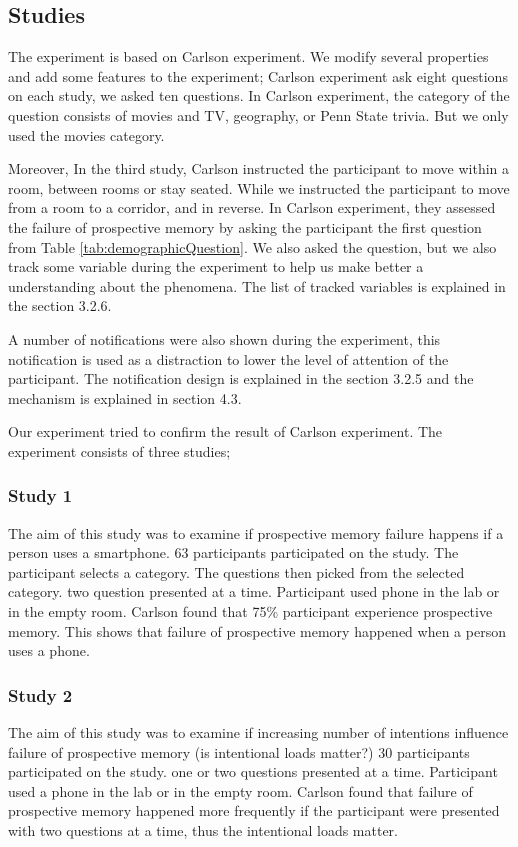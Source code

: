 \subsection{Studies}
The experiment is based on Carlson experiment. We modify several properties and add some features to the experiment;
Carlson experiment ask eight questions on each study, we asked ten questions.
In Carlson experiment, the category of the question consists of movies and TV,
geography, or Penn State trivia. But we only used the movies category.

Moreover, In the third study, Carlson instructed the participant to move within a room, between rooms or stay seated.
While we instructed the participant to move from a room to a corridor, and in reverse.
In Carlson experiment, they assessed the failure of prospective memory by asking the participant the first question
from Table \ref{tab:demographicQuestion}. We also asked the question, but we also track some variable during the experiment to help us make better
a understanding about the phenomena. The list of tracked variables is explained in the section 3.2.6.

A number of notifications were also shown during the experiment, this notification is used as a distraction to lower the level of attention
of the participant. The notification design is explained in the section 3.2.5 and the mechanism
is explained in section 4.3.

Our experiment tried to confirm the result of Carlson experiment. The experiment consists of three studies;

\subsubsection{Study 1}
The aim of this study was to examine if prospective memory failure happens if a person uses a smartphone.
63 participants participated on the study.
The participant selects a category.
 The questions then picked from the selected category.
two question presented at a time. Participant used phone in the lab or in the empty room.
Carlson found that 75\% participant experience prospective memory.
This shows that failure of prospective memory happened when a person uses a phone.

\subsubsection{Study 2}
The aim of this study was to examine if increasing number of intentions influence failure of prospective memory (is intentional loads matter?)
30 participants participated on the study.
one or two questions presented at a time.
Participant used a phone in the lab or in the empty room.
Carlson found that failure of prospective memory happened more frequently if the participant were
presented with two questions at a time, thus the intentional loads matter.

